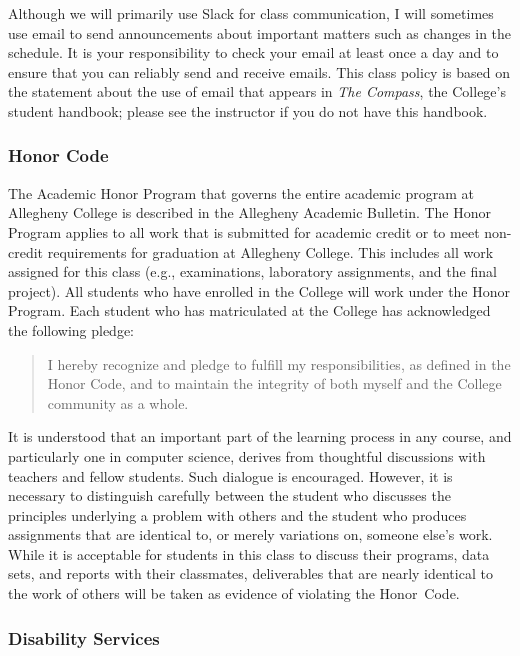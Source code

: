 \documentclass[11pt]{article}
\begin{document}
Although we will primarily use Slack for class communication, I will sometimes
use email to send announcements about important matters such as changes in the
schedule. It is your responsibility to check your email at least once a day and
to ensure that you can reliably send and receive emails. This class policy is
based on the statement about the use of email that appears in {\em The Compass},
the College's student handbook; please see the instructor if you do not have
this handbook.

\subsubsection*{Honor Code}

The Academic Honor Program that governs the entire academic program at Allegheny College is described in the Allegheny
Academic Bulletin. The Honor Program applies to all work that is submitted for academic credit or to meet non-credit
requirements for graduation at Allegheny College. This includes all work assigned for this class (e.g., examinations,
laboratory assignments, and the final project). All students who have enrolled in the College will work under the Honor
Program. Each student who has matriculated at the College has acknowledged the following pledge:

\vspace*{-.11in}
\begin{quote}
  I hereby recognize and pledge to fulfill my responsibilities, as defined in the Honor Code, and to maintain the
  integrity of both myself and the College community as a whole.
\end{quote}
\vspace*{-.11in}

\noindent It is understood that an important part of the learning process in any course, and particularly one in
computer science, derives from thoughtful discussions with teachers and fellow students. Such dialogue is encouraged.
However, it is necessary to distinguish carefully between the student who discusses the principles underlying a problem
with others and the student who produces assignments that are identical to, or merely variations on, someone else's
work. While it is acceptable for students in this class to discuss their programs, data sets, and reports with their
classmates, deliverables that are nearly identical to the work of others will be taken as evidence of violating the
\mbox{Honor Code}.

\subsubsection*{Disability Services}
\end{document}
